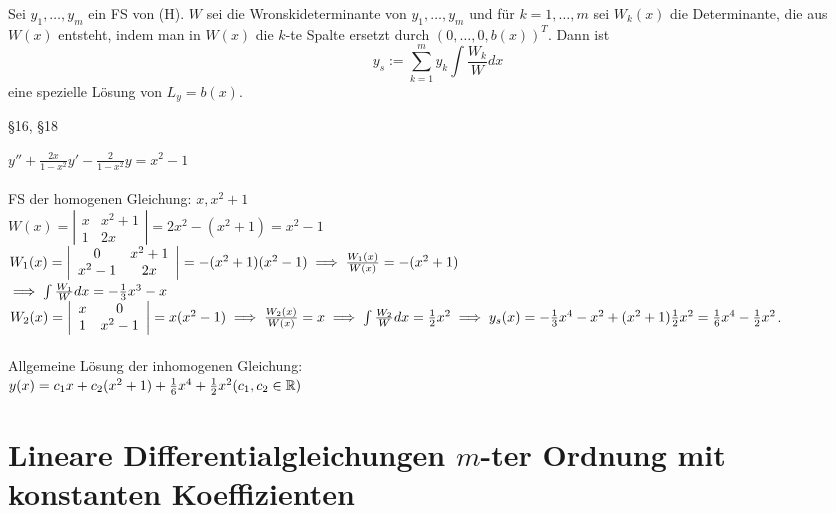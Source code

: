 \documentclass[a4paper,twoside,DIV15,BCOR12mm]{scrbook}
\begin{document}
\begin{satz} %
Sei $y_1, \ldots, y_m$ ein FS von (H). $W$ sei die Wronskideterminante von $y_1, \ldots, y_m$ und für $k=1, \ldots, m$ sei $W_k(x)$ die Determinante, die aus $W(x)$ entsteht, indem man in $W(x)$ die $k$-te Spalte ersetzt durch $(0, \ldots, 0, b(x))^T$. Dann ist
$$y_s:=\sum_{k=1}^{m}y_k\int\frac{W_k}{W}dx$$
eine spezielle Lösung von $L_y = b(x)$.
\end{satz}

\begin{beweis}
§16, §18
\end{beweis}

\begin{beispiel}
$y''+\frac{2x}{1-x^2}y'-\frac{2}{1-x^2}y = x^2-1$ \\\\
FS der homogenen Gleichung: $x, x^2+1$ \\
$W(x) = \left|\begin{array}{cc}x & x^2+1 \\ 1 & 2x\end{array}\right| = 2x^2 - (x^2+1) = x^2 - 1$ \\
$W_1(x) = \left|\begin{array}{cc}0 & x^2+1 \\ x^2-1 & 2x\end{array}\right| = -(x^2+1)(x^2-1) \implies \frac{W_1(x)}{W(x)} = -(x^2+1)$ \\
$\implies \int\frac{W_1}{W}dx = -\frac{1}{3}x^3 - x$ \\
$W_2(x) = \left|\begin{array}{cc}x & 0 \\ 1 & x^2-1\end{array}\right| = x(x^2-1) \implies \frac{W_2(x)}{W(x)} = x \implies \int\frac{W_2}{W}dx = \frac{1}{2}x^2 \\
\implies y_s(x) = -\frac{1}{3}x^4 - x^2 + (x^2+1)\frac{1}{2}x^2 = \frac{1}{6}x^4 - \frac{1}{2}x^2$. \\\\
Allgemeine Lösung der inhomogenen Gleichung: \\
$y(x) = c_1x + c_2(x^2+1)+\frac{1}{6}x^4+\frac{1}{2}x^2 (c_1,c_2 \in \mathbb{R})$
\end{beispiel}

\chapter{Lineare Differentialgleichungen $m$-ter Ordnung mit konstanten Koeffizienten}
\end{document}
